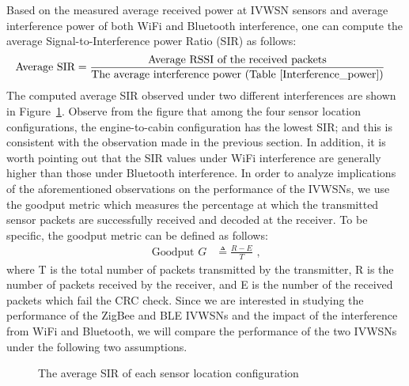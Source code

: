 \documentclass[journal]{IEEEtran}
\begin{document}
Based on the measured average received power at IVWSN sensors and average interference power of both WiFi and Bluetooth interference, one can compute the average Signal-to-Interference power Ratio (SIR) as follows:
\begin{align*}
\mbox{Average SIR} &= \frac{\mbox{Average RSSI of the received packets}}{\mbox{The average interference power (Table~\ref{Interference_power})}}
\end{align*}
The computed average SIR observed under two different interferences are shown in Figure~\ref{SIRbar}. Observe from the figure that among the four sensor location configurations, the engine-to-cabin configuration has the lowest SIR; and this is consistent with the observation made in the previous section. In addition, it is worth pointing out that the SIR values under WiFi interference are generally higher than those under Bluetooth interference. In order to analyze implications of the aforementioned observations on the performance of the IVWSNs, we use the goodput metric which measures the percentage at which the transmitted sensor packets are successfully received and decoded at the receiver. To be specific, the goodput metric can be defined as follows:
\begin{align*}
\mbox{Goodput }G  & \triangleq \frac{R-E}{T}\mbox{ ,}
\end{align*}
where T is the total number of packets transmitted by the transmitter, R is the number of packets received by the receiver, and E is the number of the received packets which fail the CRC check. 
Since we are interested in studying the performance of the ZigBee and BLE IVWSNs and the impact of the interference from WiFi and Bluetooth, we will compare the performance of the two IVWSNs under the following two assumptions.









\begin{figure}[tbp]
\centering
{}
\caption[]{The average SIR of each sensor location configuration}
\label{SIRbar}
\end{figure}
\end{document}
